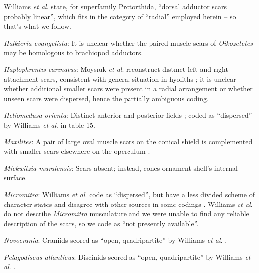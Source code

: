 \documentclass[openany]{book}
\begin{document}
Williams \emph{et al}.
\citeyearpar{Williams2000LinguliformeaCraniiformea} state, for
superfamily Protorthida, ``dorsal adductor scars probably linear'',
which fits in the category of ``radial'' employed herein -- so that's
what we follow.

\hypertarget{Halkieria_evangelista-coding-84}{}
\emph{Halkieria evangelista}: It is unclear whether the paired muscle
scars of \emph{Oikozetetes} may be homologous to brachiopod adductors.

\hypertarget{Haplophrentis_carinatus-coding-84}{}
\emph{Haplophrentis carinatus}: Moysiuk \emph{et al}.
\citeyearpar{Moysiuk2017Hyolithsare} reconstruct distinct left and right
attachment scars, consistent with general situation in hyoliths
\citep[see][]{Dzik1980Ontogenyof}; it is unclear whether additional
smaller scars were present in a radial arrangement \citep[as in e.g.
\emph{Gompholites},][]{Marek1967} or whether unseen scars were
dispersed, hence the partially ambiguous coding.

\hypertarget{Heliomedusa_orienta-coding-84}{}
\emph{Heliomedusa orienta}: Distinct anterior and posterior fields
\citep{Chen2007Reinterpretationof}; coded as ``dispersed'' by Williams
\emph{et al}. \citeyearpar{Williams2000LinguliformeaCraniiformea} in
table 15.

\hypertarget{Maxilites-coding-84}{}
\emph{Maxilites}: A pair of large oval muscle scars on the conical
shield is complemented with smaller scars elsewhere on the operculum
\citep{Marek1972, MartiMus2005}.

\hypertarget{Mickwitzia_muralensis-coding-84}{}
\emph{Mickwitzia muralensis}: Scars absent; instead, cones ornament
shell's internal surface.

\hypertarget{Micromitra-coding-84}{}
\emph{Micromitra}: Williams \emph{et al}.
\citeyearpar{Williams1998Thediversity} code as ``dispersed'', but have a
less divided scheme of character states and disagree with other sources
in some codings \citep[e.g.][in
Kutorginates]{Bassett2001Functionalmorphology}. Williams \emph{et al}.
\citeyearpar{Williams2000LinguliformeaCraniiformea} do not describe
\emph{Micromitra} musculature and we were unable to find any reliable
description of the scars, so we code as ``not presently available''.

\hypertarget{Novocrania-coding-84}{}
\emph{Novocrania}: Craniids scored as ``open, quadripartite'' by
Williams \emph{et al}. \citeyearpar{Williams1996Asupra}.

\hypertarget{Pelagodiscus_atlanticus-coding-84}{}
\emph{Pelagodiscus atlanticus}: Discinids scored as ``open,
quadripartite'' by Williams \emph{et al}.
\citeyearpar{Williams1996Asupra}.
\end{document}
